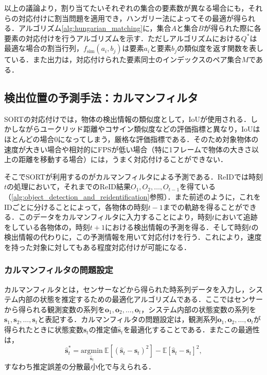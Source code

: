     以上の議論より，割り当てたいそれぞれの集合の要素数が異なる場合にも，それらの対応付けに割当問題を適用でき，ハンガリー法によってその最適が得られる．アルゴリズム\ref{alg:hungarian_matching}に，集合$A$と集合$B$が得られた際に各要素の対応付けを行うアルゴリズムを示す．ただしアルゴリズムにおける$Q^*$は最適な場合の割当行列，$f_{\text{sim}}(a_i, b_j)$は要素$a_i$と要素$b_j$の類似度を返す関数を表している．また出力は，対応付けられた要素同士のインデックスのペア集合$M$である．

    \subsection{検出位置の予測手法：カルマンフィルタ}
    \label{subsec:kalman_filter}

    SORT\cite{bewley2016simple}の対応付けでは，物体の検出情報の類似度として，IoUが使用される．しかしながらユークリッド距離やコサイン類似度などの評価指標と異なり，IoUはほとんどの場合$0$になってしまう，厳格な評価指標である．そのため対象物体の速度が大きい場合や相対的にFPSが低い場合（特に1フレームで物体の大きさ以上の距離を移動する場合）には，うまく対応付けることができない．

    そこでSORTが利用するのがカルマンフィルタによる予測である．ReIDでは時刻$t$の処理において，それまでのReID結果$O_1, O_2, \dots, O_{t-1}$を得ている（\ref{alg:object_detection_and_reidentification}参照）．また前述のように，これをIDごとに分けることによって，各物体の時刻$t-1$までの軌跡を得ることができる．このデータをカルマンフィルタに入力することにより，時刻$t$において追跡をしている各物体の，時刻$t+1$における検出情報の予測を得る．そして時刻$t$の検出情報の代わりに，この予測情報を用いて対応付けを行う．これにより，速度を持った対象に対してもある程度対応付けが可能になる．

        \subsubsection{カルマンフィルタの問題設定}
        \label{subsubsec:kalmanfilter_setting}

        カルマンフィルタ\cite{bishop2001introduction}とは，センサーなどから得られた時系列データを入力し，システム内部の状態を推定するための最適化アルゴリズムである．ここではセンサーから得られる観測変数の系列を$\bm{o}_1, \bm{o}_2, \dots, \bm{o}_t$，システム内部の状態変数の系列を$\bm{s}_1, \bm{s}_2, \dots, \bm{s}_t$と表記する．カルマンフィルタの問題設定は，観測系列$\bm{o}_1, \bm{o}_2, \dots, \bm{o}_t$が得られたときに状態変数$\bm{s}_t$の推定値$\hat{\bm{s}}_t$を最適化することである．またこの最適性は，
        \begin{equation}
            \label{eq:kalman_optimality}
            \hat{\bm{s}}_t^* = \underset{\hat{\bm{s}}_t}{\text{argmin}} ~ \mathbb{E}\left[\left(\hat{\bm{s}}_t - \bm{s}_t\right)^2\right] - \mathbb{E}\left[\hat{\bm{s}}_t - \bm{s}_t\right]^2,
        \end{equation}
        すなわち推定誤差の分散最小化で与えられる．


